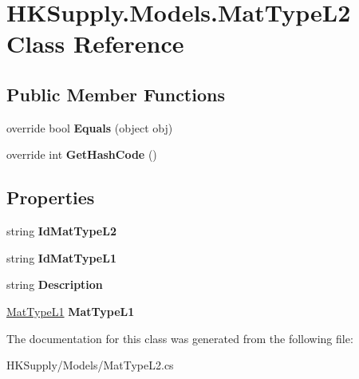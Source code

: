 \hypertarget{class_h_k_supply_1_1_models_1_1_mat_type_l2}{}\section{H\+K\+Supply.\+Models.\+Mat\+Type\+L2 Class Reference}
\label{class_h_k_supply_1_1_models_1_1_mat_type_l2}
\subsection*{Public Member Functions}
\begin{DoxyCompactItemize}
\item 
\mbox{\label{class_h_k_supply_1_1_models_1_1_mat_type_l2_a65e9e4d928bf21fd7aa9ed880f16a892}} 
override bool {\bfseries Equals} (object obj)
\item 
\mbox{\label{class_h_k_supply_1_1_models_1_1_mat_type_l2_a5e377434c57b43a5f001dc8a613f21e2}} 
override int {\bfseries Get\+Hash\+Code} ()
\end{DoxyCompactItemize}
\subsection*{Properties}
\begin{DoxyCompactItemize}
\item 
\mbox{\label{class_h_k_supply_1_1_models_1_1_mat_type_l2_affa5801f55c07c487d5ce46d56277885}} 
string {\bfseries Id\+Mat\+Type\+L2}
\item 
\mbox{\label{class_h_k_supply_1_1_models_1_1_mat_type_l2_a6834b8038fa92d62e150c6301717b93e}} 
string {\bfseries Id\+Mat\+Type\+L1}
\item 
\mbox{\label{class_h_k_supply_1_1_models_1_1_mat_type_l2_ad187ca77623b3b3e2c217bd450ffd88e}} 
string {\bfseries Description}
\item 
\mbox{\label{class_h_k_supply_1_1_models_1_1_mat_type_l2_a6a9d16ee78ff4a846b8443c8f0f91b78}} 
\mbox{\hyperlink{class_h_k_supply_1_1_models_1_1_mat_type_l1}{Mat\+Type\+L1}} {\bfseries Mat\+Type\+L1}
\end{DoxyCompactItemize}


The documentation for this class was generated from the following file\+:\begin{DoxyCompactItemize}
\item 
H\+K\+Supply/\+Models/Mat\+Type\+L2.\+cs\end{DoxyCompactItemize}
